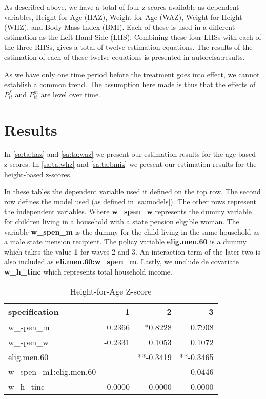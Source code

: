 \begin{refsection}
As described above, we have a total of four z-scores available as dependent variables, Height-for-Age (HAZ), Weight-for-Age (WAZ), Weight-for-Height (WHZ), and Body Mass Index (BMI). Each of these is used in a different estimation as the Left-Hand Side (LHS).
Combining these four LHSs with each of the three RHSs, gives a total of twelve estimation equations.
The results of the estimation of each of these twelve equations is presented in autoref{sa:results}.

As we have only one time period before the treatment goes into effect,
we cannot establish a common trend.
The assumption here made is thus that the effects of $P^f_{it}$ and $P^m_{it}$ are level over time.


\section{Results}
\label{sa:results}
In \autoref{sa:ta:haz} and \autoref{sa:ta:waz} we present our estimation results for the age-based z-scores.
In \autoref{sa:ta:whz} and \autoref{sa:ta:bmiz} we present our estimation results for the height-based z-scores.

In these tables the dependent variable used it defined on the top row.
The second row defines the model used (as defined in \autoref{sa:models}).
The other rows represent the independent variables.
Where \textbf{w\_spen\_w} represents the dummy variable for children living in a household with a state pension eligible woman.
The variable \textbf{w\_spen\_m} is the dummy for the child living in the same household as a male state mension recipient.
The policy variable \textbf{elig.men.60} is a dummy which takes the value \textbf{1} for waves 2 and 3.
An interaction term of the later two is also included as \textbf{eli.men.60:w\_spen\_m}.
Lastly, we unclude de covariate \textbf{w\_h\_tinc} which represents total household income.

\begin{table}[!ht]
\centering
\caption{Height-for-Age Z-score}
\label{sa:ta:haz}
\begin{tabular}{l|rrr}
\hline
specification & 1 & 2 & 3\\
\hline
w\_spen\_m & 0.2366 & *0.8228 & 0.7908 \\
w\_spen\_w & -0.2331 & 0.1053 & 0.1072 \\
elig.men.60 & & **-0.3419 & **-0.3465 \\
w\_spen\_m1:elig.men.60 & & & 0.0446 \\
w\_h\_tinc & -0.0000 & -0.0000 & -0.0000 \\
\end{tabular}
\end{table}


\end{refsection}
